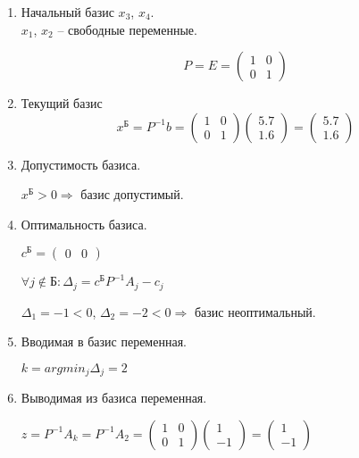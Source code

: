 \begin{enumerate}
\begin{enumerate}

	\item Начальный базис $x_3$, $x_4$.\\
	 $x_1$, $x_2$ -- свободные переменные.
	
	\begin{displaymath}
		P = E = \begin{pmatrix}
			1 & 0 \\ 0 & 1
		\end{pmatrix}
	\end{displaymath}

	\item Текущий базис\\
	\begin{displaymath}
		x^{\text{Б}} = P^{-1}b = \begin{pmatrix}
			1 & 0 \\ 0 & 1
		\end{pmatrix}
		\begin{pmatrix}
			5.7 \\ 1.6
		\end{pmatrix}
		=
		\begin{pmatrix}
			5.7 \\ 1.6
		\end{pmatrix}
	\end{displaymath}

	\item Допустимость базиса.
	
	$x^{\text{Б}} > 0 \Rightarrow$ базис допустимый.

	\item Оптимальность базиса.
	
	$c^\text{Б} = \begin{pmatrix}
		0 & 0
	\end{pmatrix}$

	$\forall j \notin \text{Б} : \Delta_j = c^\text{Б} P^{-1} A_j - c_j$

	$\Delta_1 = -1 < 0$, $\Delta_2 = -2 < 0 \Rightarrow$ базис неоптимальный.

	\item Вводимая в базис переменная.
	
	$k = argmin_j \Delta_j = 2$
	
	\item Выводимая из базиса переменная.
	
	$z = P^{-1} A_k = P^{-1} A_2 = \begin{pmatrix}
		1 & 0 \\ 0 & 1
	\end{pmatrix}
	\begin{pmatrix}
		1 \\ -1
	\end{pmatrix}
	=
	\begin{pmatrix}
		1 \\ -1
	\end{pmatrix}$
	

\end{enumerate}
\end{enumerate}

